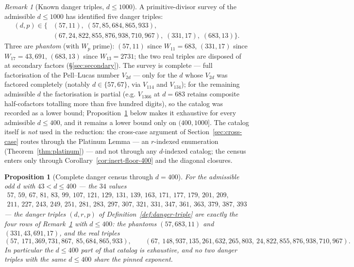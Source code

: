 \documentclass[11pt]{amsart}
\theoremstyle{plain}
\newtheorem{proposition}[theorem]{Proposition}
\theoremstyle{definition}
\theoremstyle{remark}
\newtheorem{remark}[theorem]{Remark}
\numberwithin{equation}{section}
\begin{document}
\begin{remark}[Known danger triples, $d \leq 1000$]\label{rem:known-danger}
A primitive-divisor survey of the admissible $d \leq 1000$ has identified five danger triples:
\[
  \begin{aligned}
  (d, p) \in \{& (57, 11),\; (57, 85{,}684{,}865{,}933),\\
               & (67, 24{,}822{,}855{,}876{,}938{,}710{,}967),\; (331, 17),\; (683, 13)\}.
  \end{aligned}
\]
Three are \emph{phantom} (with $W_p$ prime): $(57, 11)$ since $W_{11} = 683$, $(331, 17)$ since $W_{17} = 43{,}691$, $(683, 13)$ since $W_{13} = 2731$; the two real triples are disposed of at secondary factors (\S\ref{sec:secondary}). The survey is complete --- full factorisation of the Pell--Lucas number $V_{2d}$ --- only for the $d$ whose $V_{2d}$ was factored completely (notably $d \in \{57, 67\}$, via $V_{114}$ and $V_{134}$); for the remaining admissible $d$ the factorisation is partial (e.g. $V_{1366}$ at $d = 683$ retains composite half-cofactors totalling more than five hundred digits), so the catalog was recorded as a lower bound; Proposition~\ref{prop:danger-census-400} below makes it exhaustive for every admissible $d \leq 400$, and it remains a lower bound only on $(400, 1000]$. The catalog itself is \emph{not} used in the reduction: the cross-case argument of Section~\ref{sec:cross-case} routes through the Platinum Lemma --- an $r$-indexed enumeration (Theorem~\ref{thm:platinum}) --- and not through any $d$-indexed catalog; the census enters only through Corollary~\ref{cor:inert-floor-400} and the diagonal closures.
\end{remark}

\begin{proposition}[Complete danger census through $d = 400$]\label{prop:danger-census-400}
For the admissible odd $d$ with $43 < d \leq 400$ --- the $34$ values
\[
  \begin{gathered}
  57,\, 59,\, 67,\, 81,\, 83,\, 99,\, 107,\, 121,\, 129,\, 131,\, 139,\, 163,\, 171,\, 177,\, 179,\, 201,\, 209,\\
  211,\, 227,\, 243,\, 249,\, 251,\, 281,\, 283,\, 297,\, 307,\, 321,\, 331,\, 347,\, 361,\, 363,\, 379,\, 387,\, 393
  \end{gathered}
\]
--- the danger triples $(d, r, p)$ of Definition~\ref{def:danger-triple} are exactly the four rows of Remark~\ref{rem:known-danger} with $d \leq 400$: the phantoms $(57, 683, 11)$ and $(331, 43{,}691, 17)$, and the real triples
\[
  (57,\ 171{,}369{,}731{,}867,\ 85{,}684{,}865{,}933), \qquad
  (67,\ 148{,}937{,}135{,}261{,}632{,}265{,}803,\ 24{,}822{,}855{,}876{,}938{,}710{,}967).
\]
In particular the $d \leq 400$ part of that catalog is exhaustive, and no two danger triples with the same $d \leq 400$ share the pinned exponent.
\end{proposition}
\end{document}
